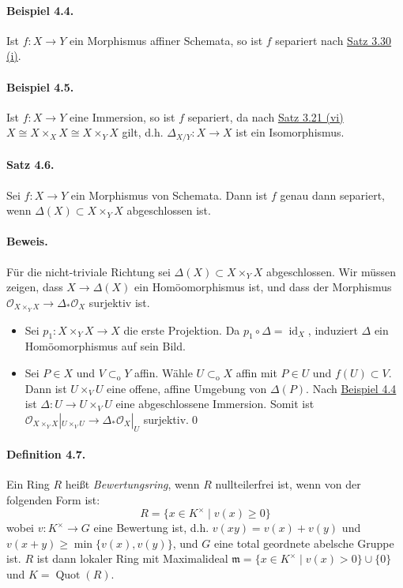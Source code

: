 \paragraph{Beispiel 4.4.}\label{4.4} Ist $f:X\to Y$ ein Morphismus affiner Schemata, so ist $f$ separiert nach \hyperref[3.30]{Satz 3.30 (i)}.

\paragraph{Beispiel 4.5.}\label{4.5} Ist $f:X\to Y$ eine Immersion, so ist $f$ separiert, da nach \hyperref[3.21]{Satz 3.21 (vi)} $X\cong X\times_XX\cong X\times_YX$ gilt, d.h. $\Delta_{X/Y}:X\to X$ ist ein Isomorphismus.

\paragraph{Satz 4.6.}\label{4.6} Sei $f:X\to Y$ ein Morphismus von Schemata. Dann ist $f$ genau dann separiert, wenn $\Delta(X)\subset X\times_YX$ abgeschlossen ist.

\paragraph{Beweis.} Für die nicht-triviale Richtung sei $\Delta(X)\subset X\times_YX$ abgeschlossen. Wir müssen zeigen, dass $X\to \Delta(X)$ ein Homöomorphismus ist, und dass der Morphismus $\mathcal{O}_{X\times_YX}\to\Delta_\ast\mathcal{O}_X$ surjektiv ist.
\begin{itemize}
\item Sei $p_1:X\times_YX\to X$ die erste Projektion. Da $p_1\circ\Delta=\operatorname{id}_X$, induziert $\Delta$ ein Homöomorphismus auf sein Bild.
\item Sei $P\in X$ und $V\subset_\text{o} Y$ affin. Wähle $U\subset_\text{o}X$ affin mit $P\in U$ und $f(U)\subset V$. Dann ist $U\times_VU$ eine offene, affine Umgebung von $\Delta(P)$. Nach \hyperref[4.4]{Beispiel 4.4} ist $\Delta:U\to U\times_VU$ eine abgeschlossene Immersion. Somit ist $\mathcal{O}_{X\times_YX}|_{U\times_VU}\to \Delta_\ast\mathcal{O}_X|_U$ surjektiv.\qed
\end{itemize}

\paragraph{Definition 4.7.}\label{4.7} Ein Ring $R$ heißt \textit{Bewertungsring}, wenn $R$ nullteilerfrei ist, wenn von der folgenden Form ist:
\[R=\{x\in K^\times\mid v(x)\geq 0\} \]
wobei $v:K^\times\to G$ eine Bewertung ist, d.h. $v(xy)=v(x)+v(y)$ und $v(x+y)\geq\min\{v(x),v(y)\}$, und $G$ eine total geordnete abelsche Gruppe ist. $R$ ist dann lokaler Ring mit Maximalideal $\mathfrak{m}=\{x\in K^\times\mid v(x)>0\}\cup\{0\}$ und $K=\operatorname{Quot}(R)$.

